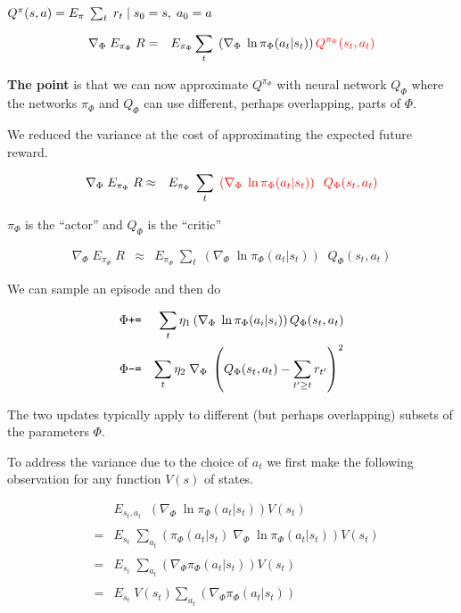 {\vfill
$Q^\pi(s,a) = E_{\pi}\;\sum_t\; r_t\;|\;s_0=s,\;a_0=a$

\begin{eqnarray*}
  \nabla_\Phi \;E_{\pi_\Phi}\;R   & = & E_{\pi_\Phi} \sum_t\; \left(\nabla_\Phi \;\ln \pi_\Phi(a_t|s_t)\right) {\color{red} Q^{\pi_\Phi}(s_t,a_t)}
\end{eqnarray*}

\vfill
{\bf The point} is that we can now approximate $Q^{\pi_\Phi}$ with neural network $Q_\Phi$ where the networks $\pi_\Phi$ and $Q_\Phi$ can use different, perhaps overlapping, parts of $\Phi$.

\vfill
We reduced the variance at the cost of approximating the expected future reward.


\begin{eqnarray*}
  \nabla_\Phi \;E_{\pi_\Phi}\;R   & \approx & E_{\pi_\Phi} \; \sum_t\; {\color{red} \left(\nabla_\Phi \;\ln \pi_\Phi(a_t|s_t)\right) \;\;Q_\Phi(s_t,a_t)}
\end{eqnarray*}

\vfill
\centerline{{\color{red} $\pi_\Phi$} is the ``actor'' and {\color{red} $Q_\Phi$} is the ``critic''}

\begin{eqnarray*}
  \nabla_\Phi \;E_{\pi_\Phi}\;R   & \approx & E_{\pi_\Phi} \; \sum_t\; \left(\nabla_\Phi \;\ln \pi_\Phi(a_t|s_t)\right) \;\;Q_\Phi(s_t,a_t)
\end{eqnarray*}

We can sample an episode and then do

\begin{eqnarray*}
  \Phi  &\mbox{\tt +=} & \sum_t \eta_1\left(\nabla_{\Phi}\;\ln \pi_{\Phi}(a_i|s_i)\right)Q_\Phi(s_t,a_t)\\
  \Phi & \mbox{\tt -=} & \sum_t \eta_2 \;\nabla_{\Phi}\;\left(Q_\Phi(s_t,a_t) - \sum_{t' \geq t} r_{t'}\right)^2
\end{eqnarray*}

The two updates typically apply to different (but perhaps overlapping) subsets of the parameters $\Phi$.


To address the variance due to the choice of $a_t$ we first make the following observation for any function $V(s)$ of states.

\begin{eqnarray*}
 & & E_{s_t,a_t} \;  \; \left(\nabla_\Phi \;\ln \pi_\Phi(a_t|s_t)\right) V(s_t) \\
 \\
 & = & E_{s_t} \;  \sum_{a_t} \left(\pi_\Phi(a_t|s_t) \;\nabla_\Phi \;\ln \pi_\Phi(a_t|s_t)\right) V(s_t) \\
 \\
 & = & E_{s_t} \;  \sum_{a_t} \left(\nabla_\Phi \pi_\Phi(a_t|s_t)\right) V(s_t) \\
 \\
 & = & E_{s_t} \;  V(s_t) \sum_{a_t} \left(\nabla_\Phi \pi_\Phi(a_t|s_t)\right)
\end{eqnarray*}

}
